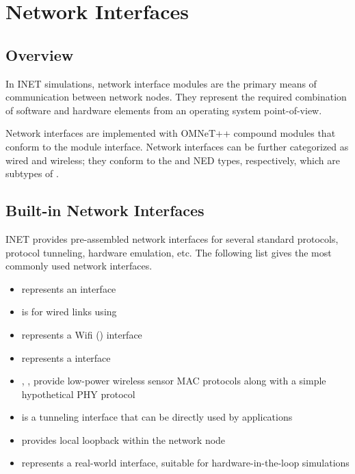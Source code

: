 \chapter{Network Interfaces}
\label{cha:network-interfaces}

\section{Overview}


In INET simulations, network interface modules are the primary means of
communication between network nodes. They represent the required
combination of software and hardware elements from an operating system
point-of-view. 

Network interfaces are implemented with OMNeT++ compound modules that
conform to the  module interface. 
Network interfaces can be further categorized as wired and wireless;
they conform to the  and 
NED types, respectively, which are subtypes of .

\section{Built-in Network Interfaces}

INET provides pre-assembled network interfaces for several standard
protocols, protocol tunneling, hardware emulation, etc. The following list
gives the most commonly used network interfaces.

\begin{itemize}
    \item {} represents an  interface
    \item {} is for wired links using 
    \item {} represents a Wifi () interface
    \item {} represents a  interface
    \item {}, ,  provide 
      low-power wireless sensor MAC protocols along with a simple hypothetical PHY protocol
    \item {} is a tunneling interface that can be directly used by applications
    \item {} provides local loopback within the network node
    \item {} represents a real-world interface, suitable for hardware-in-the-loop simulations
\end{itemize}

